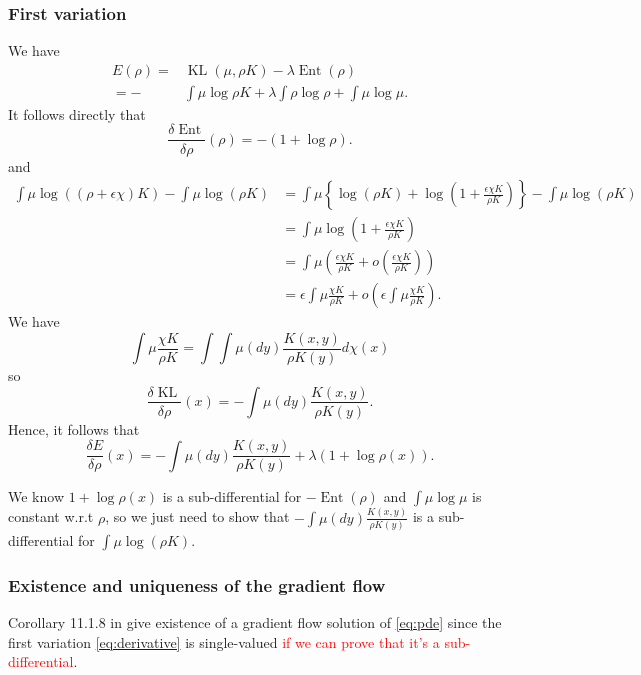 \documentclass[a4paper]{article}
\theoremstyle{definition}
\DeclareMathOperator{\KL}{KL}
\DeclareMathOperator{\ent}{Ent}
\begin{document}
\subsubsection{First variation}

We have
\begin{align*}
E(\rho)= & \KL(\mu,\rho K)-\lambda\ent(\rho)\\
=- & \int\mu\log\rho K+\lambda\int\rho\log\rho+\int\mu\log\mu.
\end{align*}
It follows directly that 
\[
\frac{\delta\ent }{\delta\rho}\left(\rho\right)=-(1+\log\rho).
\]
and 
\begin{align*}
\int\mu\log\left(\left(\rho+\epsilon\chi\right)K\right)-\int\mu\log\left(\rho K\right) & =\int\mu\left\{ \log\left(\rho K\right)+\log\left(1+\frac{\epsilon\chi K}{\rho K}\right)\right\} -\int\mu\log\left(\rho K\right)\\
 & =\int\mu\log\left(1+\frac{\epsilon\chi K}{\rho K}\right)\\
 & =\int\mu\left(\frac{\epsilon\chi K}{\rho K}+o\left(\frac{\epsilon\chi K}{\rho K}\right)\right)\\
 & =\epsilon\int\mu\frac{\chi K}{\rho K}+o\left(\epsilon\int\mu\frac{\chi K}{\rho K}\right).
\end{align*}
We have 
\[
\int\mu\frac{\chi K}{\rho K}=\int\int\mu\left(dy\right)\frac{K(x,y)}{\rho K(y)}d\chi\left(x\right)
\]
so 
\[
\frac{\delta \KL}{\delta\rho}\left(x\right)=-\int\mu\left(dy\right)\frac{K(x,y)}{\rho K(y)}.
\]
Hence, it follows that 
\begin{equation}
\label{eq:derivative}
\frac{\delta E}{\delta\rho}\left(x\right)=-\int\mu\left(dy\right)\frac{K(x,y)}{\rho K(y)}+\lambda\left(1+\log\rho\left(x\right)\right).
\end{equation}

We know $1+\log\rho\left(x\right)$ is a sub-differential for $-\ent(\rho)$ \citep[Lemma 8]{carrillo2006contractions} and $\int \mu \log \mu$ is constant w.r.t $\rho$, so we just need to show that $-\int\mu\left(dy\right)\frac{K(x,y)}{\rho K(y)}$ is a sub-differential for $\int \mu\log(\rho K)$.

\subsubsection{Existence and uniqueness of the gradient flow}

Corollary 11.1.8 in \cite{ambrosio2008gradient} give existence of a gradient flow solution of \eqref{eq:pde} since the first variation \eqref{eq:derivative} is single-valued \textcolor{red}{if we can prove that it's a sub-differential}.
\end{document}
